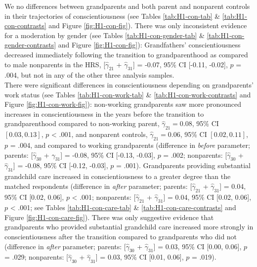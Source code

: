 \documentclass[
  english,
  man,floatsintext]{apa7}
\begin{document}
We no differences between grandparents and both parent and nonparent controls in their trajectories of conscientiousness (see Tables \ref{tab:H1-con-tab} \& \ref{tab:H1-con-contrasts} and Figure \ref{fig:H1-con-fig}). There was only inconsistent evidence for a moderation by gender (see Tables \ref{tab:H1-con-gender-tab} \& \ref{tab:H1-con-gender-contrasts} and Figure \ref{fig:H1-con-fig}): Grandfathers' conscientiousness decreased immediately following the transition to grandparenthood as compared to male nonparents in the HRS, {[}\(\hat{\gamma}_{21}\) + \(\hat{\gamma}_{31}\){]} = -0.07, 95\% CI {[}-0.11, -0.02{]}, \(p\) = .004, but not in any of the other three analysis samples.\\
There were significant differences in conscientiousness depending on grandparents' work status (see Tables \ref{tab:H1-con-work-tab} \& \ref{tab:H1-con-work-contrasts} and Figure \ref{fig:H1-con-work-fig}): non-working grandparents saw more pronounced increases in conscientiousness in the years before the transition to grandparenthood compared to non-working parent, \(\hat{\gamma}_{21} = 0.08\), 95\% CI \([0.03, 0.13]\), \(p\) \textless{} .001, and nonparent controls, \(\hat{\gamma}_{21} = 0.06\), 95\% CI \([0.02, 0.11]\), \(p\) = .004, and compared to working grandparents (difference in \emph{before} parameter; parents: {[}\(\hat{\gamma}_{30}\) + \(\hat{\gamma}_{31}\){]} = -0.08, 95\% CI {[}-0.13, -0.03{]}, \(p\) = .002; nonparents: {[}\(\hat{\gamma}_{30}\) + \(\hat{\gamma}_{31}\){]} = -0.08, 95\% CI {[}-0.12, -0.03{]}, \(p\) = .001). Grandparents providing substantial grandchild care increased in conscientiousness to a greater degree than the matched respondents (difference in \emph{after} parameter; parents: {[}\(\hat{\gamma}_{21}\) + \(\hat{\gamma}_{31}\){]} = 0.04, 95\% CI {[}0.02, 0.06{]}, \(p\) \textless{} .001; nonparents: {[}\(\hat{\gamma}_{21}\) + \(\hat{\gamma}_{31}\){]} = 0.04, 95\% CI {[}0.02, 0.06{]}, \(p\) \textless{} .001; see Tables \ref{tab:H1-con-care-tab} \& \ref{tab:H1-con-care-contrasts} and Figure \ref{fig:H1-con-care-fig}). There was only suggestive evidence that grandparents who provided substantial grandchild care increased more strongly in conscientiousness after the transition compared to grandparents who did not (difference in \emph{after} parameter; parents: {[}\(\hat{\gamma}_{30}\) + \(\hat{\gamma}_{31}\){]} = 0.03, 95\% CI {[}0.00, 0.06{]}, \(p\) = .029; nonparents: {[}\(\hat{\gamma}_{30}\) + \(\hat{\gamma}_{31}\){]} = 0.03, 95\% CI {[}0.01, 0.06{]}, \(p\) = .019).
\end{document}
